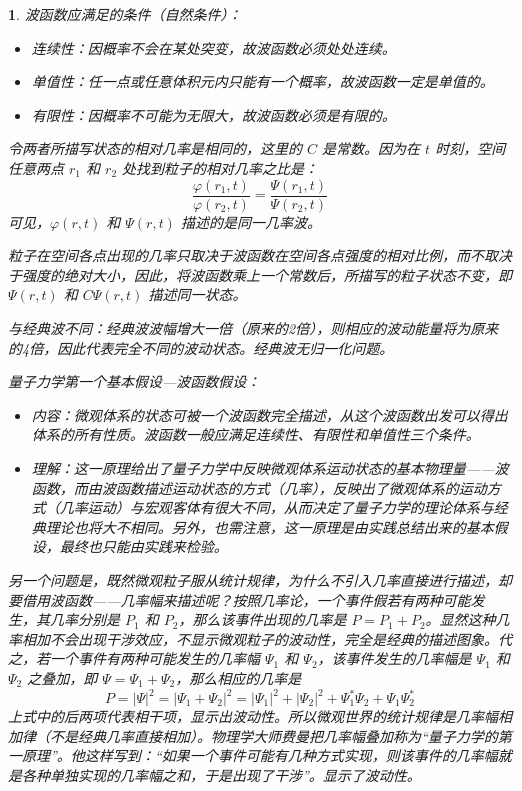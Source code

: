 \documentclass[UTF8]{report}
\theoremstyle{MyLineTheoremStyle} %
\theoremstyle{MyBlockTheoremStyle} %
\theoremstyle{MySubsubsectionStyle} %
\newtheorem{definition}{}
\begin{document}
\begin{definition}
    波函数应满足的条件（自然条件）：
    \begin{itemize}
        \item 连续性：因概率不会在某处突变，故波函数必须处处连续。
        \item 单值性：任一点或任意体积元内只能有一个概率，故波函数一定是单值的。
        \item 有限性：因概率不可能为无限大，故波函数必须是有限的。
    \end{itemize}

    令两者所描写状态的相对几率是相同的，这里的 \(C\) 是常数。因为在 \(t\) 时刻，空间任意两点 \(r_1\) 和 \(r_2\) 处找到粒子的相对几率之比是：
    \[
    \frac{\varphi(r_1,t)}{\varphi(r_2,t)} = \frac{\Psi(r_1,t)}{\Psi(r_2,t)}
    \]
    可见，\(\varphi(r,t)\) 和 \(\Psi(r,t)\) 描述的是同一几率波。

    粒子在空间各点出现的几率只取决于波函数在空间各点强度的相对比例，而不取决于强度的绝对大小，因此，将波函数乘上一个常数后，所描写的粒子状态不变，即 \(\Psi (r, t)\) 和 \(C\Psi (r, t)\) 描述同一状态。

    与经典波不同：经典波波幅增大一倍（原来的2倍），则相应的波动能量将为原来的4倍，因此代表完全不同的波动状态。经典波无归一化问题。

    量子力学第一个基本假设—波函数假设：
    \begin{itemize}
        \item 内容：微观体系的状态可被一个波函数完全描述，从这个波函数出发可以得出体系的所有性质。波函数一般应满足连续性、有限性和单值性三个条件。
        \item 理解：这一原理给出了量子力学中反映微观体系运动状态的基本物理量——波函数，而由波函数描述运动状态的方式（几率），反映出了微观体系的运动方式（几率运动）与宏观客体有很大不同，从而决定了量子力学的理论体系与经典理论也将大不相同。另外，也需注意，这一原理是由实践总结出来的基本假设，最终也只能由实践来检验。
    \end{itemize}

    另一个问题是，既然微观粒子服从统计规律，为什么不引入几率直接进行描述，却要借用波函数——几率幅来描述呢？按照几率论，一个事件假若有两种可能发生，其几率分别是 \(P_1\) 和 \(P_2\)，那么该事件出现的几率是 \(P = P_1 + P_2\)。显然这种几率相加不会出现干涉效应，不显示微观粒子的波动性，完全是经典的描述图象。代之，若一个事件有两种可能发生的几率幅 \(\Psi_1\) 和 \(\Psi_2\)，该事件发生的几率幅是 \(\Psi_1\) 和 \(\Psi_2\) 之叠加，即 \(\Psi = \Psi_1 + \Psi_2\)，那么相应的几率是
    \[
    P = |\Psi|^2 = |\Psi_1 + \Psi_2|^2 = |\Psi_1|^2 + |\Psi_2|^2 + \Psi_1^* \Psi_2 + \Psi_1 \Psi_2^*
    \]
    上式中的后两项代表相干项，显示出波动性。所以微观世界的统计规律是几率幅相加律（不是经典几率直接相加）。物理学大师费曼把几率幅叠加称为“量子力学的第一原理”。他这样写到：“如果一个事件可能有几种方式实现，则该事件的几率幅就是各种单独实现的几率幅之和，于是出现了干涉”。显示了波动性。


\end{definition}
\end{document}
